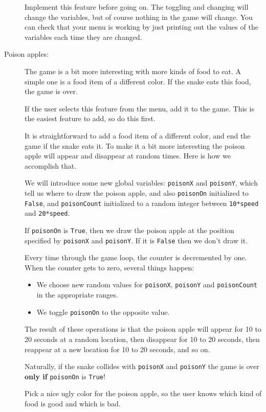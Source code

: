 \documentclass[12pt]{article}
\begin{document}
\begin{description}
Implement this feature before going on.  The toggling and changing
will change the variables, but of course nothing in the game will
change.  You can check that your menu is working by just printing
out the values of the variables each time they are changed.

\item[Poison apples:]  The game is a bit more interesting with
more kinds of food to eat.  A simple one is a food item of a different
color. If the snake eats this food, the game is over.

If the user selects this feature from the menu, add it to
the game.  This is the easiest feature to add, so do this
first.

It is straightforward to add a food item of a different color,
and end the game if the snake eats it.  To make it a bit 
more interesting the poison apple will appear and disappear
at random times.  Here is how we accomplish that.

We will introduce some new global variables:
\lstinline{poisonX} and \lstinline{poisonY}, which tell us
where to draw the poison apple, and also \lstinline{poisonOn}
initialized to \lstinline{False},
and \lstinline{poisonCount} initialized to a random integer
between \lstinline{10*speed} and \lstinline{20*speed}.

If \lstinline{poisonOn} is \lstinline{True}, then we draw
the poison apple at the position specified by \lstinline{poisonX}
and \lstinline{poisonY}.  If it is \lstinline{False} then
we don't draw it.

Every time through the game loop, the counter is decremented
by one.  When the counter gets to zero, several things happen:
\begin{itemize}
\item We choose new random values for \lstinline{poisonX},
\lstinline{poisonY} and \lstinline{poisonCount} in the 
appropriate ranges.
\item We toggle \lstinline{poisonOn} to the opposite value.
\end{itemize}
The result of these operations is that the poison apple will
appear for 10 to 20 seconds at a random location, 
then disappear for 10 to 20 seconds, then reappear at a new
location for 10 to 20 seconds, and so on.

Naturally, if the snake collides with \lstinline{poisonX}
and \lstinline{poisonY} the game is over {\bf only if}
\lstinline{poisonOn} is \lstinline{True}!

Pick a nice ugly color for the poison apple, so the user
knows which kind of food is good and which is bad.


\end{description}
\end{document}
